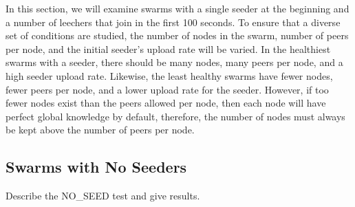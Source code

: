 In this section, we will examine swarms with a single seeder at the beginning
and a number of leechers that join in the first 100 seconds. To ensure
that a diverse set of conditions are studied, the number of nodes in the swarm, 
number of peers per node, and the initial seeder's upload rate will be varied.
In the healthiest swarms with a seeder, there should be many nodes, many peers per node, and
a high seeder upload rate. Likewise, the least healthy swarms have fewer nodes,
fewer peers per node, and a lower upload rate for the seeder. However, if too fewer
nodes exist than the peers allowed per node, then each node will have perfect global
knowledge by default, therefore, the number of nodes must always be kept above
the number of peers per node. 








\subsection{Swarms with No Seeders}

Describe the NO\_SEED test and give results.

